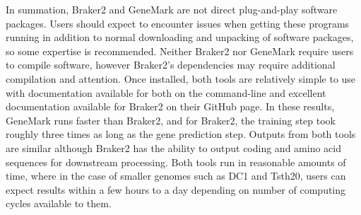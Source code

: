 
In summation, Braker2 and GeneMark are not direct plug-and-play
software packages. Users should expect to encounter issues when
getting these programs running in addition to normal downloading and
unpacking of software packages, so some expertise is
recommended. Neither Braker2 nor GeneMark require users to compile
software, however Braker2's dependencies may require additional
compilation and attention. Once installed, both tools are relatively
simple to use with documentation available for both on the command-line
and excellent documentation available for Braker2 on their GitHub
page. In these results, GeneMark runs faster than Braker2, and for Braker2, the training step took roughly three times as long as the gene prediction step. Outputs from both tools are similar although Braker2 has the
ability to output coding and amino acid sequences for downstream
processing. Both tools run in reasonable amounts of time, where in the
case of smaller genomes such as DC1 and Tsth20, users can expect
results within a few hours to a day depending on number of computing
cycles available to them.
